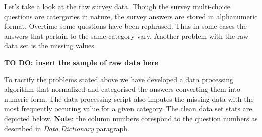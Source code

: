 Let's take a look at the raw survey data. Though the survey multi-choice
questions are catergories in nature, the survey answers are stored in
alphanumeric format. Overtime some questions have been rephrased. Thus
in some cases the answers that pertain to the same category vary.
Another problem with the raw data set is the missing values.

\textbf{TO DO: insert the sample of raw data here}

To ractify the problems stated above we have developed a data processing
algorithm that normalized and categorised the answers converting them
into numeric form. The data processing script also imputes the missing
data with the most frequently occuring value for a given category. The
clean data set stats are depicted below. \textbf{Note}: the column
numbers corespond to the question numbers as described in \emph{Data
Dictionary} paragraph.

